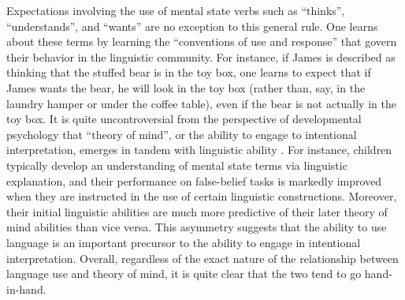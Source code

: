 Expectations involving the use of mental state verbs such as ``thinks'', ``understands'', and ``wants'' are no exception to this general rule. One learns about these terms by learning the ``conventions of use and response'' \citep[][p. 50]{Millikan:2005} that govern their behavior in the linguistic community. For instance, if James is described as  thinking that the stuffed bear is in the toy box, one learns to expect that if James wants the bear, he will look in the toy box (rather than, say, in the laundry hamper or under the coffee table), even if the bear is not actually in the toy box. It is quite uncontroversial from the perspective of developmental psychology that ``theory of mind'', or the ability to engage to intentional interpretation, emerges in tandem with linguistic ability \citep{Miller:2006}. For instance, children typically develop an understanding of mental state terms via linguistic explanation, and their performance on false-belief tasks is markedly improved when they are instructed in the use of certain linguistic constructions. Moreover, their initial linguistic abilities are much more predictive of their later theory of mind abilities than vice versa. This asymmetry suggests that the ability to use language is an important precursor to the ability to engage in intentional interpretation. Overall, regardless of the exact nature of the relationship between language use and theory of mind, it is quite clear that the two tend to go hand-in-hand.

